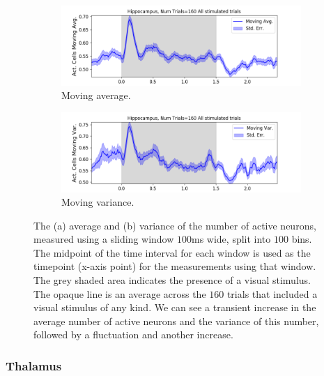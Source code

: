 \documentclass[a4paper,12pt]{article}
\theoremstyle{definition}
\begin{document}
    \begin{figure}[h]
      \begin{subfigure}[h]{\linewidth}
        \includegraphics[width=\linewidth]{figures/hippocampus_1ms_moving_avg_all_stimulated_trials.png}
        \caption{Moving average.}
        \label{fig:hippocampus_moving_avg_num_active_cells}
      \end{subfigure}
      \begin{subfigure}[h]{\linewidth}
        \includegraphics[width=\linewidth]{figures/hippocampus_1ms_moving_var_all_stimulated_trials.png}
        \caption{Moving variance.}
        \label{fig:hippocampus_moving_var_num_active_cells}
      \end{subfigure}
      \caption{The (a) average and (b) variance of the number of active neurons, measured using a sliding window $100$ms wide, split into $100$ bins. The midpoint of the time interval for each window is used as the timepoint (x-axis point) for the measurements using that window. The grey shaded area indicates the presence of a visual stimulus. The opaque line is an average across the $160$ trials that included a visual stimulus of any kind. We can see a transient increase in the average number of active neurons and the variance of this number, followed by a fluctuation and another increase.}
      \label{fig:hippocampus_moving_avg_and_var}
    \end{figure}

    \newpage

    \subsubsection{Thalamus}
\end{document}
